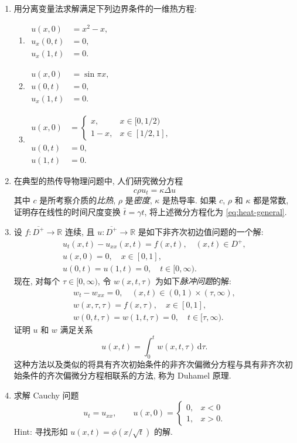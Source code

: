 \begin{enumerate}[label=\thesection.\arabic*.,ref=\thesection.\arabic*,start=21,series=book-problems]

\item\label{ex:heat-three-boundary-problems} 用分离变量法求解满足下列边界条件的一维热方程:\begin{enumerate}[label=(\alph*)]
\item $\begin{aligned}u(x,0)&=x^2-x,\\u_x(0,t)&=0,\\u_x(1,t)&=0.\end{aligned}$
\item $\begin{aligned}u(x,0)&=\sin\pi x,\\u(0,t)&=0,\\u_x(1,t)&=0.\end{aligned}$
\item $\begin{aligned}
u(x,0)&=\begin{cases}x,&x\in[0,1/2)\\1-x,&x\in[1/2,1],\end{cases}\\
u(0,t)&=0,\\u(1,t)&=0.
\end{aligned}$
\end{enumerate}

\item\label{ex:heat-physical-time-scaling} 在典型的热传导物理问题中, 人们研究微分方程
\[
c\rho u_t=\kappa\Delta u
\]
其中 $c$ 是所考察介质的\emph{比热}, $\rho$ 是\emph{密度}, $\kappa$ 是热导率. 如果 $c$, $\rho$ 和 $\kappa$ 都是常数, 证明存在线性的时间尺度变换 $\bar t=\gamma t$, 将上述微分方程化为 \eqref{eq:heat-general}.

\item\label{ex:duhamel-heat-pulse} 设 $f:\overline{D^+}\to\mathbb{R}$ 连续, 且 $u:\overline{D^+}\to\mathbb{R}$ 是如下非齐次初边值问题的一个解:
\[
\begin{gathered}
u_t(x,t)-u_{xx}(x,t)=f(x,t),\quad(x,t)\in D^+,\\
u(x,0)=0,\quad x\in[0,1],\\
u(0,t)=u(1,t)=0,\quad t\in[0,\infty).
\end{gathered}
\]
现在, 对每个 $\tau\in[0,\infty)$, 令 $w(x,t,\tau)$ 为如下\emph{脉冲问题}的解:
\[
\begin{gathered}
w_t-w_{xx}=0,\quad(x,t)\in(0,1)\times(\tau,\infty),\\
w(x,\tau,\tau)=f(x,\tau),\quad x\in[0,1],\\
w(0,t,\tau)=w(1,t,\tau)=0,\quad t\in[\tau,\infty).
\end{gathered}
\]
证明 $u$ 和 $w$ 满足关系
\[
u(x,t)=\int_0^tw(x,t,\tau)\,\mathrm{d}\tau.
\]
这种方法以及类似的将具有齐次初始条件的非齐次偏微分方程与具有非齐次初始条件的齐次偏微分方程相联系的方法, 称为 Duhamel 原理.

\item\label{ex:heat-step-cauchy-problem} 求解 Cauchy 问题
\[
u_t=u_{xx},\qquad u(x,0)=\begin{cases}0,&x<0\\1,&x>0.\end{cases}
\]
Hint: 寻找形如 $u(x,t)=\phi(x/\sqrt t)$ 的解.

\end{enumerate}
